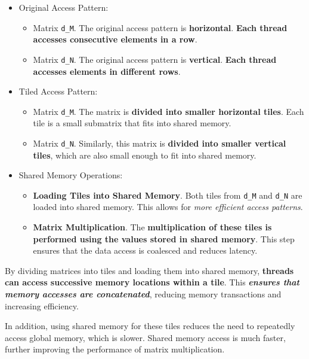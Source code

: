 \begin{itemize}
    \item Original Access Pattern:
    \begin{itemize}
        \item Matrix \texttt{d\_M}. The original access pattern is \textbf{horizontal}. \textbf{Each thread accesses consecutive elements in a row}.

        \item Matrix \texttt{d\_N}. The original access pattern is \textbf{vertical}. \textbf{Each thread accesses elements in different rows}.
    \end{itemize}

    \newpage

    \item Tiled Access Pattern:
    \begin{itemize}
        \item Matrix \texttt{d\_M}. The matrix is \textbf{divided into smaller horizontal tiles}. Each tile is a small submatrix that fits into shared memory.

        \item Matrix \texttt{d\_N}. Similarly, this matrix is \textbf{divided into smaller vertical tiles}, which are also small enough to fit into shared memory.
    \end{itemize}

    \item Shared Memory Operations:
    \begin{itemize}
        \item \textbf{Loading Tiles into Shared Memory}. Both tiles from \texttt{d\_M} and \texttt{d\_N} are loaded into shared memory. This allows for \emph{more efficient access patterns}.
        
        \item \textbf{Matrix Multiplication}. The \textbf{multiplication of these tiles is performed using the values stored in shared memory}. This step ensures that the data access is coalesced and reduces latency.
    \end{itemize}
\end{itemize}
By dividing matrices into tiles and loading them into shared memory, \textbf{threads can access successive memory locations within a tile}. This \textbf{\emph{ensures that memory accesses are concatenated}}, reducing memory transactions and increasing efficiency.

\highspace
In addition, using shared memory for these tiles reduces the need to repeatedly access global memory, which is slower. Shared memory access is much faster, further improving the performance of matrix multiplication.

